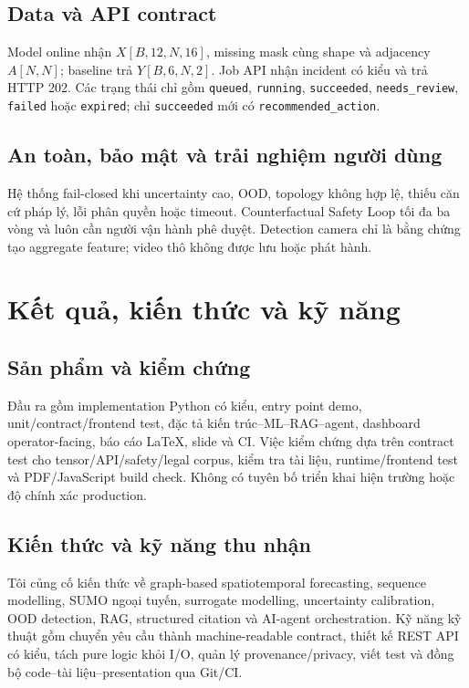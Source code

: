 \documentclass[12pt,a4paper]{report}
\begin{document}
\section{Data và API contract}
Model online nhận $X[B,12,N,16]$, missing mask cùng shape và adjacency $A[N,N]$; baseline trả $Y[B,6,N,2]$. Job API nhận incident có kiểu và trả HTTP 202. Các trạng thái chỉ gồm \texttt{queued}, \texttt{running}, \texttt{succeeded}, \texttt{needs\_review}, \texttt{failed} hoặc \texttt{expired}; chỉ \texttt{succeeded} mới có \texttt{recommended\_action}.

\section{An toàn, bảo mật và trải nghiệm người dùng}
Hệ thống fail-closed khi uncertainty cao, OOD, topology không hợp lệ, thiếu căn cứ pháp lý, lỗi phân quyền hoặc timeout. Counterfactual Safety Loop tối đa ba vòng và luôn cần người vận hành phê duyệt. Detection camera chỉ là bằng chứng tạo aggregate feature; video thô không được lưu hoặc phát hành.

\chapter{Kết quả, kiến thức và kỹ năng}
\section{Sản phẩm và kiểm chứng}
Đầu ra gồm implementation Python có kiểu, entry point demo, unit/contract/frontend test, đặc tả kiến trúc--ML--RAG--agent, dashboard operator-facing, báo cáo LaTeX, slide và CI. Việc kiểm chứng dựa trên contract test cho tensor/API/safety/legal corpus, kiểm tra tài liệu, runtime/frontend test và PDF/JavaScript build check. Không có tuyên bố triển khai hiện trường hoặc độ chính xác production.

\section{Kiến thức và kỹ năng thu nhận}
Tôi củng cố kiến thức về graph-based spatiotemporal forecasting, sequence modelling, SUMO ngoại tuyến, surrogate modelling, uncertainty calibration, OOD detection, RAG, structured citation và AI-agent orchestration. Kỹ năng kỹ thuật gồm chuyển yêu cầu thành machine-readable contract, thiết kế REST API có kiểu, tách pure logic khỏi I/O, quản lý provenance/privacy, viết test và đồng bộ code--tài liệu--presentation qua Git/CI.
\end{document}
